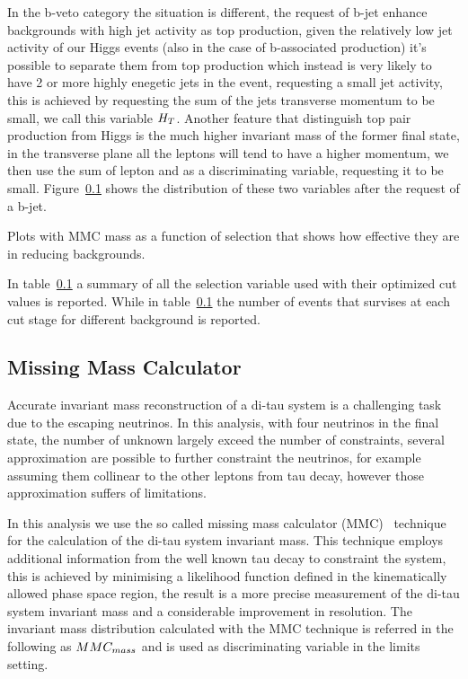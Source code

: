 In the b-veto category the situation is different, 
the  request of b-jet enhance backgrounds with high jet activity as top production, given the relatively low
jet activity of our Higgs events (also in the case of b-associated production) it's possible to separate them from
top production which instead is very likely to have 2 or more highly enegetic jets in the event, requesting a small jet activity, 
this is achieved by requesting the sum of the jets transverse momentum to be small, we call this variable $H_{T}$.
Another feature that distinguish top pair production from Higgs is the much higher invariant mass of the former final state,
in the transverse plane all the leptons will tend to have a higher momentum, we then use the sum of lepton \pt and \met as
a discriminating variable, requesting it to be small. Figure~\ref{} shows the distribution of these two variables 
after the request of a b-jet.

Plots with MMC mass as a function of selection that shows how effective they are in reducing backgrounds.

In table~\ref{} a summary of all the selection variable used with their optimized cut values is reported.
While in table~\ref{} the number of events that survises at each cut stage for different background is reported.


\subsection{Missing Mass Calculator}
Accurate invariant mass reconstruction of a di-tau system is a challenging task due to the escaping neutrinos.
In this analysis, with four neutrinos in the final state, the number of unknown largely exceed the number of constraints,
several approximation are possible to further constraint the neutrinos, for example assuming them collinear to the 
other leptons from tau decay, however those approximation suffers of limitations. 

In this analysis we use the so called missing mass calculator (MMC)~\cite{MMC}
technique for the calculation of the di-tau system invariant mass. This technique employs additional 
information from the well known tau decay to constraint the system, this is achieved by minimising a likelihood function 
defined in the kinematically allowed phase space region, the result is a more precise measurement of the di-tau 
system invariant mass and a considerable improvement in resolution. The invariant mass distribution 
calculated with the MMC technique is referred in the following as $MMC_{mass}$ and is used as discriminating 
variable in the limits setting.



